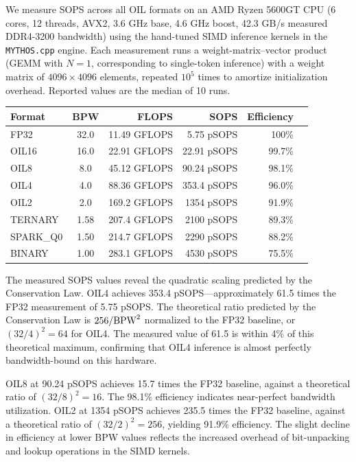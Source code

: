 We measure SOPS across all OIL formats on an AMD Ryzen 5600GT CPU (6 cores, 12 threads, AVX2, 3.6 GHz base, 4.6 GHz boost, 42.3 GB/s measured DDR4-3200 bandwidth) using the hand-tuned SIMD inference kernels in the \texttt{MYTHOS.cpp} engine. Each measurement runs a weight-matrix--vector product (GEMM with $N = 1$, corresponding to single-token inference) with a weight matrix of $4096 \times 4096$ elements, repeated $10^5$ times to amortize initialization overhead. Reported values are the median of 10 runs.

\begin{center}
\tablestyle
\begin{tabular}{lcrrrr}
\toprule
\textbf{Format} & \textbf{BPW} & \textbf{FLOPS} & \textbf{SOPS} & \textbf{Efficiency} \\
\midrule
FP32 & 32.0 & 11.49 GFLOPS & 5.75 pSOPS & 100\% \\
OIL16 & 16.0 & 22.91 GFLOPS & 22.91 pSOPS & 99.7\% \\
OIL8 & 8.0 & 45.12 GFLOPS & 90.24 pSOPS & 98.1\% \\
OIL4 & 4.0 & 88.36 GFLOPS & 353.4 pSOPS & 96.0\% \\
OIL2 & 2.0 & 169.2 GFLOPS & 1354 pSOPS & 91.9\% \\
TERNARY & 1.58 & 207.4 GFLOPS & 2100 pSOPS & 89.3\% \\
SPARK\_Q0 & 1.50 & 214.7 GFLOPS & 2290 pSOPS & 88.2\% \\
BINARY & 1.00 & 283.1 GFLOPS & 4530 pSOPS & 75.5\% \\
\bottomrule
\end{tabular}
\end{center}

The measured SOPS values reveal the quadratic scaling predicted by the Conservation Law. OIL4 achieves 353.4 pSOPS---approximately 61.5 times the FP32 measurement of 5.75 pSOPS. The theoretical ratio predicted by the Conservation Law is $256 / \textnormal{BPW}^2$ normalized to the FP32 baseline, or $(32/4)^2 = 64$ for OIL4. The measured value of 61.5 is within 4\% of this theoretical maximum, confirming that OIL4 inference is almost perfectly bandwidth-bound on this hardware.

OIL8 at 90.24 pSOPS achieves 15.7 times the FP32 baseline, against a theoretical ratio of $(32/8)^2 = 16$. The 98.1\% efficiency indicates near-perfect bandwidth utilization. OIL2 at 1354 pSOPS achieves 235.5 times the FP32 baseline, against a theoretical ratio of $(32/2)^2 = 256$, yielding 91.9\% efficiency. The slight decline in efficiency at lower BPW values reflects the increased overhead of bit-unpacking and lookup operations in the SIMD kernels.

